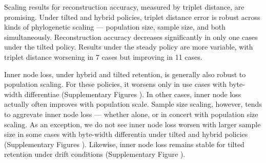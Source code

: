 Scaling results for reconstruction accuracy, measured by triplet distance, are promising.
Under tilted and hybrid policies, triplet distance error is robust across kinds of phylogenetic scaling --- population size, sample size, and both simultaneously.
Reconstruction accuracy decreases significantly in only one cases under the tilted policy.
Results under the steady policy are more variable, with triplet distance worsening in 7 cases but improving in 11 cases.

Inner node loss, under hybrid and tilted retention, is generally also robust to population scaling.
For these policies, it worsens only in use cases with byte-width differentiae (Supplementary Figures ).
In other cases, inner node loss actually often improves with population scale.
Sample size scaling, however, tends to aggrevate inner node loss --- whether alone, or in concert with population size scaling.
As an exception, we do not see inner node loss worsen with larger sample size in some cases with byte-width differentia under tilted and hybrid policies (Supplementary Figures ).
Likewise, inner node loss remains stable for tilted retention under drift conditions (Supplementary Figure ).
